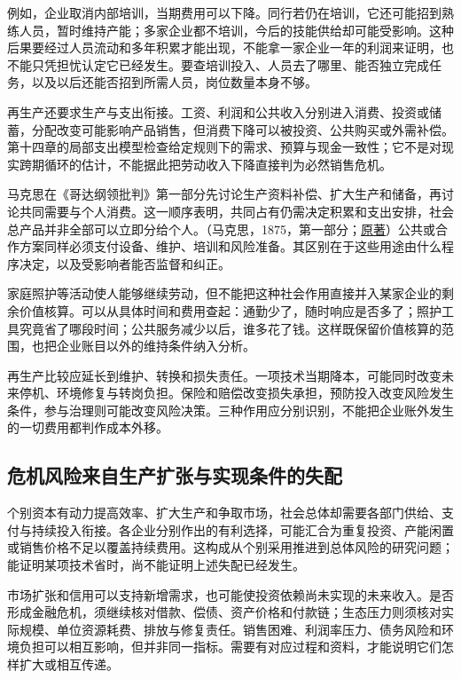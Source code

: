 \documentclass[UTF8,fontset=windows,12pt,a4paper,oneside,openany]{ctexbook}
\begin{document}
例如，企业取消内部培训，当期费用可以下降。同行若仍在培训，它还可能招到熟练人员，暂时维持产能；多家企业都不培训，今后的技能供给却可能受影响。这种后果要经过人员流动和多年积累才能出现，不能拿一家企业一年的利润来证明，也不能只凭担忧认定它已经发生。要查培训投入、人员去了哪里、能否独立完成任务，以及以后还能否招到所需人员，岗位数量本身不够。

再生产还要求生产与支出衔接。工资、利润和公共收入分别进入消费、投资或储蓄，分配改变可能影响产品销售，但消费下降可以被投资、公共购买或外需补偿。第十四章的局部支出模型检查给定规则下的需求、预算与现金一致性；它不是对现实跨期循环的估计，不能据此把劳动收入下降直接判为必然销售危机。

马克思在《哥达纲领批判》第一部分先讨论生产资料补偿、扩大生产和储备，再讨论共同需要与个人消费。这一顺序表明，共同占有仍需决定积累和支出安排，社会总产品并非全部可以立即分给个人。（马克思，1875，第一部分；\href{https://www.marxists.org/archive/marx/works/1875/gotha/ch01.htm}{原著}）公共或合作方案同样必须支付设备、维护、培训和风险准备。其区别在于这些用途由什么程序决定，以及受影响者能否监督和纠正。

家庭照护等活动使人能够继续劳动，但不能把这种社会作用直接并入某家企业的剩余价值核算。可以从具体时间和费用查起：通勤少了，随时响应是否多了；照护工具究竟省了哪段时间；公共服务减少以后，谁多花了钱。这样既保留价值核算的范围，也把企业账目以外的维持条件纳入分析。

再生产比较应延长到维护、转换和损失责任。一项技术当期降本，可能同时改变未来停机、环境修复与转岗负担。保险和赔偿改变损失承担，预防投入改变风险发生条件，参与治理则可能改变风险决策。三种作用应分别识别，不能把企业账外发生的一切费用都判作成本外移。

\subsection{危机风险来自生产扩张与实现条件的失配}

个别资本有动力提高效率、扩大生产和争取市场，社会总体却需要各部门供给、支付与持续投入衔接。各企业分别作出的有利选择，可能汇合为重复投资、产能闲置或销售价格不足以覆盖持续费用。这构成从个别采用推进到总体风险的研究问题；能证明某项技术省时，尚不能证明上述失配已经发生。

市场扩张和信用可以支持新增需求，也可能使投资依赖尚未实现的未来收入。是否形成金融危机，须继续核对借款、偿债、资产价格和付款链；生态压力则须核对实际规模、单位资源耗费、排放与修复责任。销售困难、利润率压力、债务风险和环境负担可以相互影响，但并非同一指标。需要有对应过程和资料，才能说明它们怎样扩大或相互传递。
\end{document}
